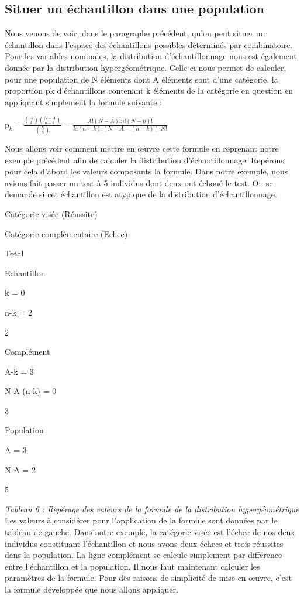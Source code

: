 \documentclass[]{book}
\theoremstyle{definition}
\theoremstyle{definition}
\theoremstyle{definition}
\theoremstyle{remark}
\begin{document}
\hypertarget{situer-un-echantillon-dans-une-population}{%
\subsection{Situer un échantillon dans une
population}\label{situer-un-echantillon-dans-une-population}}

Nous venons de voir, dans le paragraphe précédent, qu'on peut situer un
échantillon dans l'espace des échantillons possibles déterminés par
combinatoire. Pour les variables nominales, la distribution
d'échantillonnage nous est également donnée par la distribution
hypergéométrique. Celle-ci nous permet de calculer, pour une population
de N éléments dont A éléments sont d'une catégorie, la proportion pk
d'échantillons contenant k éléments de la catégorie en question en
appliquant simplement la formule suivante :

\(\textrm{p}_{k} = \frac{\binom{A}{k}\binom{N-A}{n-k}}{\binom{N}{n}}=\frac{A!(N-A)!n!(N-n)!}{k!(n-k)!(N-A-(n-k))!N!}\)

Nous allons voir comment mettre en œuvre cette formule en reprenant
notre exemple précédent afin de calculer la distribution
d'échantillonnage. Repérons pour cela d'abord les valeurs composants la
formule. Dans notre exemple, nous avions fait passer un test à 5
individus dont deux ont échoué le test. On se demande si cet échantillon
est atypique de la distribution d'échantillonnage.

Catégorie visée (Réussite)

Catégorie complémentaire (Echec)

Total

Echantillon

k = 0

n-k = 2

2

Complément

A-k = 3

N-A-(n-k) = 0

3

Population

A = 3

N-A = 2

5

\emph{Tableau 6 : Repérage des valeurs de la formule de la distribution
hypergéométrique} Les valeurs à considérer pour l'application de la
formule sont données par le tableau de gauche. Dans notre exemple, la
catégorie visée est l'échec de nos deux individus constituant
l'échantillon et nous avons deux échecs et trois réussites dans la
population. La ligne complément se calcule simplement par différence
entre l'échantillon et la population. Il nous faut maintenant calculer
les paramètres de la formule. Pour des raisons de simplicité de mise en
œuvre, c'est la formule développée que nous allons appliquer.
\end{document}
